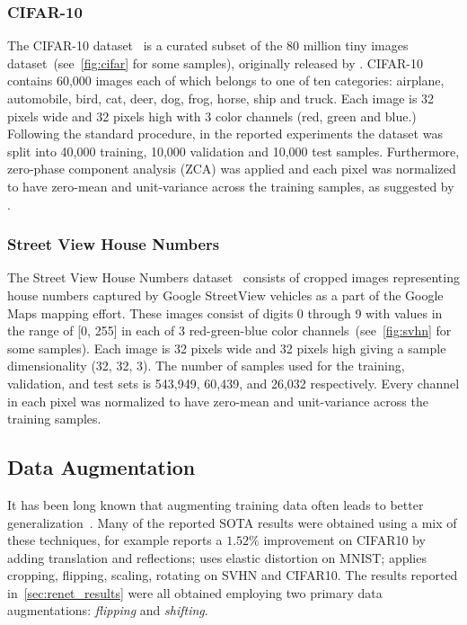 \subsubsection{CIFAR-10}
The CIFAR-10 dataset~\citep{KrizhevskyHinton2009} is a curated subset of the 80
million tiny images dataset~(see~\autoref{fig:cifar} for some samples),
originally released by \citet{Torralba+Fergus+Freeman-2008}. CIFAR-10 contains
60,000 images each of which belongs to one of ten categories: airplane,
automobile, bird, cat, deer, dog, frog, horse, ship and truck. Each image is 32
pixels wide and 32 pixels high with 3 color channels (red, green and blue.)
Following the standard procedure, in the reported experiments the dataset
was split into 40,000 training, 10,000 validation and 10,000 test samples.
Furthermore, zero-phase component analysis (ZCA) was applied and each pixel
was normalized to have zero-mean and unit-variance across the training samples,
as suggested by \citet{KrizhevskyHinton2009}.

\subsubsection{Street View House Numbers}
The Street View House Numbers dataset~\citep{Netzer-wkshp-2011} consists
of cropped images representing house numbers captured by Google StreetView
vehicles as a part of the Google Maps mapping effort. These images consist of
digits 0 through 9 with values in the range of [0, 255] in each of 3
red-green-blue color channels~(see~\autoref{fig:svhn} for some samples). Each
image is 32 pixels wide and 32 pixels high giving a sample dimensionality (32,
32, 3). The number of samples used for the training, validation, and test sets
is 543,949, 60,439, and 26,032 respectively. Every channel in each pixel was
normalized to have zero-mean and unit-variance across the training samples.

\subsection{Data Augmentation}

It has been long known that augmenting training data often leads to better
generalization~\citep[see, e.g.,][]{Krizhevsky-2012}. Many of the reported
SOTA results were obtained using a mix of these techniques, for example
\citep{Goodfellow2013} reports a $1.52\%$ improvement on CIFAR10 by adding
translation and reflections; \citep{DBLP:conf/icdar/SimardSP03} uses elastic
distortion on MNIST; \citep{DBLP:conf/icml/WanZZLF13} applies cropping,
flipping, scaling, rotating on SVHN and CIFAR10. The results reported
in~\autoref{sec:renet_results} were all obtained employing two primary data
augmentations: {\it flipping} and {\it shifting}.

